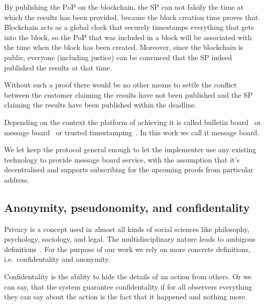 \documentclass{ieeeaccess}
\begin{document}
By publishing the $\mathrm{PoP}$ on the blockchain, the SP can not falsify the time
at which the results has been provided, because the block creation time
proves that. Blockchain acts as a global clock that securely timestamps
everything that gets into the block, so the $\mathrm{PoP}$ that was included in a
block will be associated with the time when the block has been created. Moreover, since the blockchain is public, everyone (including justice) can be convinced that the SP indeed published the results at that time.

Without such a proof there would be no other means to settle the conflict between the customer claiming the results have not been published and the SP claiming the results have been published within the deadline.

Depending on the context the platform of achieving it is called bulletin board~\cite{achenbach2015improved} or message board~\cite{hinarejos2019solution} or trusted timestamping~\cite{gipp2015decentralized}. In this work we call it message board.



We let keep the protocol general enough to let the implementer use any
existing technology to provide message board service, with the
assumption that it's decentralised and supports subscribing for the
upcoming proofs from particular address.



\subsection{Anonymity, pseudonomity, and confidentality}\label{sec:pseudo-anon}


Privacy is a concept used in almost all kinds of social sciences like philosophy, psychology, sociology, and legal. The multidisciplinary nature leads to ambigous definitions~\cite{smith2011information}. For the purpose of our work we rely on more concrete definitions, i.e.~confidentality and anonymity.

Confidentality is the ability to hide the details of an action from others. Or we can say, that the system guarantee confidentality if for all observers everything they can say about the action is the fact that it happened and nothing more.
\end{document}
